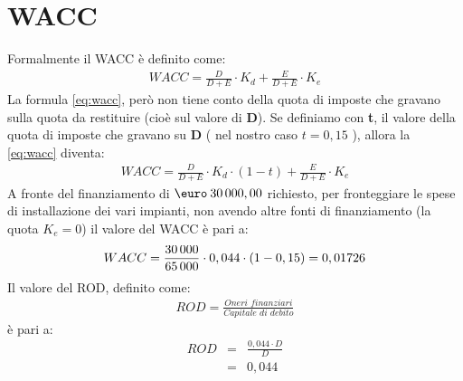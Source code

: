\section[WACC]{WACC}
	Formalmente il \ac{WACC} è definito come:	
	\begin{equation}
	\label{eq:wacc}
	\begin{split}
		WACC = \frac{D}{D+E} \cdot K_d + \frac{E}{D+E} \cdot K_e 
	\end{split}
	\end{equation}
	La formula \ref{eq:wacc}, però non tiene conto della quota di imposte che gravano sulla quota da restituire (cioè sul valore di \textbf{D}). \newline 
	Se definiamo con \textbf{t}, il valore della quota di imposte che gravano su \textbf{D} ( nel nostro caso $ t = 0,15 $ ), allora la \ref{eq:wacc} diventa:
	\begin{equation}
	\label{eq:wacc_tax}
	\begin{split}
		WACC = \frac{D}{D+E} \cdot K_d \cdot ( 1 - t ) + \frac{E}{D+E} \cdot K_e 
	\end{split}
	\end{equation}	
	A fronte del finanziamento di $\mbox{\euro} \: 30\thinspace 000,00$ richiesto, per fronteggiare le spese di installazione dei vari impianti, non avendo altre fonti di finanziamento (la quota $K_e = 0$) il valore del \ac{WACC} è pari a:
	\begin{equation}
	\label{eq:wacc_tax_value}
	\begin{split}
		WACC = \frac{30\thinspace 000}{65\thinspace 000} \cdot 0,044 \cdot ( 1 - 0,15 ) = 0,01726 
	\end{split}
	\end{equation}
	Il valore del \ac{ROD}, definito come:
	\begin{equation}
	\label{eq:rod_definizione}
	\begin{split}
		ROD = \frac{\textit{Oneri finanziari}}{\textit{Capitale di debito}} 
	\end{split}
	\end{equation}
	è pari a:
	\begin{eqnarray}
	\label{eq:rod_calcolo}	
		ROD & = & \frac{0,044 \cdot D}{D} \nonumber \\
			& = & 0,044	
	\end{eqnarray}